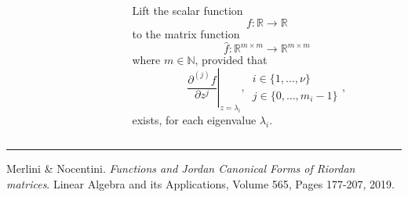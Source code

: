 \documentclass[9pt]{beamer}
\begin{document}
\begin{frame}[fragile]
\begin{columns}
\begin{column}{0.6\textwidth}
\begin{displaymath}
        \end{displaymath}
    \end{column}
    \begin{column}{0.4\textwidth}
    Lift the scalar function $$f: \mathbb{R} \rightarrow \mathbb{R}$$
    to the matrix function
    $$\hat{f}: \mathbb{R}^{m\times m} \rightarrow \mathbb{R}^{m\times m}$$
    where $m\in\mathbb{N}$, provided that
    \begin{displaymath}
        \left. \frac{\partial^{(j)}{f}}{\partial{z}^{j}} \right|_{z=\lambda_{i}},\,
        \begin{array}{l}
            i\in \lbrace 1, \ldots, \nu \rbrace \\
            j \in \lbrace 0, \ldots, m_{i}-1 \rbrace
        \end{array},
    \end{displaymath}
    exists, for each eigenvalue $\lambda_{i}$.
    \end{column}
\end{columns}
\vfill
\noindent\rule{\textwidth}{0.1pt}
{\footnotesize
Merlini \& Nocentini. \textit{Functions and Jordan Canonical Forms of Riordan
matrices}. \newline Linear Algebra and its Applications, Volume 565, Pages 177-207, 2019.}
\end{frame}
\end{document}
